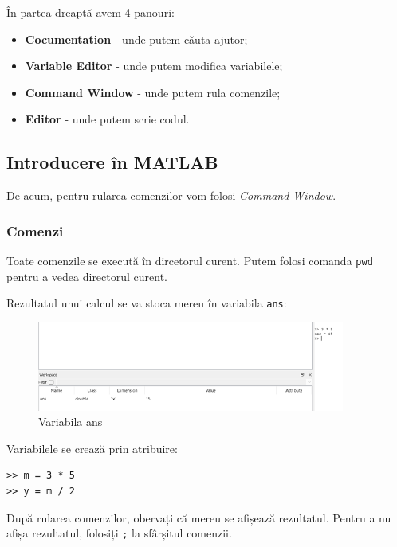 \documentclass{exam}
\begin{document}
\par În partea dreaptă avem 4 panouri:

\begin{itemize}
	\item \textbf{Cocumentation} - unde putem căuta ajutor;
	\item \textbf{Variable Editor} - unde putem modifica variabilele;
	\item \textbf{Command Window} - unde putem rula comenzile;
	\item \textbf{Editor} - unde putem scrie codul.
\end{itemize}

\subsection{Introducere în MATLAB}

\par De acum, pentru rularea comenzilor vom folosi \textit{Command Window}.

\subsubsection{Comenzi}

\par Toate comenzile se execută în dircetorul curent. Putem folosi comanda \verb|pwd|
pentru a vedea directorul curent.

\newpage
\par Rezultatul unui calcul se va stoca mereu în variabila \verb|ans|:

\begin{figure}[ht]
	\centering
	\includegraphics[width=0.9\textwidth]{ans}
	\caption{Variabila ans}
\end{figure}

\par Variabilele se crează prin atribuire:

\begin{lstlisting}
>> m = 3 * 5
>> y = m / 2
\end{lstlisting}

\par După rularea comenzilor, obervați că mereu se afișează rezultatul. Pentru a
nu afișa rezultatul, folosiți \verb|;| la sfârșitul comenzii.
\end{document}
